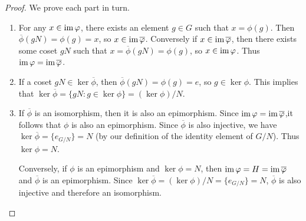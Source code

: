 \begin{proof}
    We prove each part in turn.

    \begin{enumerate}[label=(\alph*), wide]
        \item For any \(x \in \operatorname{im} \varphi\), there exists an element \(g \in G\)
        such that \(x = \phi(g)\). Then \(\overline{\phi}(gN) = \phi(g) = x\),
        so \(x \in \operatorname{im} \overline{\varphi}\). Conversely if \(x \in \operatorname{im}
        \overline{\varphi}\), then there exists some coset \(gN\) such that \(x =
        \overline{\phi}(gN) = \phi(g)\), so \(x \in \operatorname{im} \varphi\). Thus \(\operatorname{im}
        \varphi = \operatorname{im} \overline{\varphi}\).
        
        \item If a coset \(gN \in \ker \overline{\phi}\), then
        \(\overline{\phi}(gN) = \phi(g) = e\), so \(g \in \ker \phi\). This
        implies that \(\ker \overline{\phi} = \{gN : g \in \ker \phi\} = (\ker
        \phi)/N\).
        
        \item If \(\overline{\phi}\) is an isomorphism, then it is also an
        epimorphism. Since \(\operatorname{im} \varphi = \operatorname{im} \overline{\varphi}\),it follows that
        \(\phi\) is also an epimorphism. Since \(\overline{\phi}\) is also
        injective, we have \(\ker \overline{\phi} = \{e_{G/N}\} = N\) (by our
        definition of the identity element of \(G/N\)). Thus \(\ker \phi = N\).
        
        Conversely, if \(\phi\) is an epimorphism and \(\ker \phi = N\), then
        \(\operatorname{im} \varphi = H = \operatorname{im} \overline{\varphi}\) and \(\overline{\phi}\) is an
        epimorphism. Since \(\ker \overline{\phi} = (\ker \phi)/N = \{e_{G/N}\}
        = N\), \(\overline{\phi}\) is also injective and therefore an
        isomorphism.
    \end{enumerate}
\end{proof}

